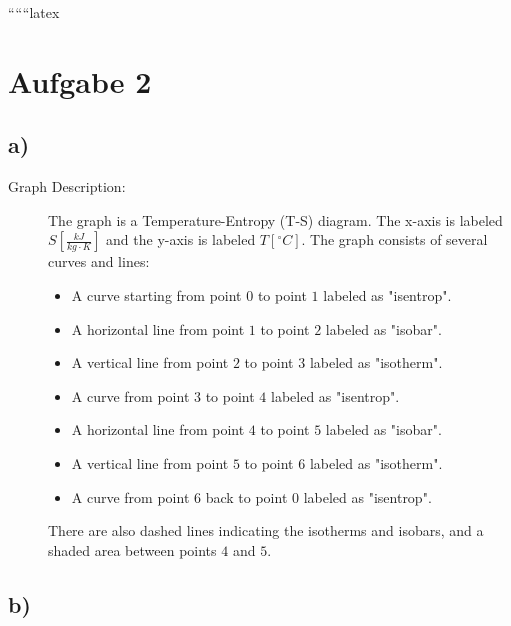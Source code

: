 
``````latex


\section*{Aufgabe 2}

\subsection*{a)}

\begin{description}
    \item[Graph Description:] The graph is a Temperature-Entropy (T-S) diagram. The x-axis is labeled $S \left[ \frac{kJ}{kg \cdot K} \right]$ and the y-axis is labeled $T [^\circ C]$. The graph consists of several curves and lines:
    \begin{itemize}
        \item A curve starting from point $0$ to point $1$ labeled as "isentrop".
        \item A horizontal line from point $1$ to point $2$ labeled as "isobar".
        \item A vertical line from point $2$ to point $3$ labeled as "isotherm".
        \item A curve from point $3$ to point $4$ labeled as "isentrop".
        \item A horizontal line from point $4$ to point $5$ labeled as "isobar".
        \item A vertical line from point $5$ to point $6$ labeled as "isotherm".
        \item A curve from point $6$ back to point $0$ labeled as "isentrop".
    \end{itemize}
    There are also dashed lines indicating the isotherms and isobars, and a shaded area between points $4$ and $5$.
\end{description}

\subsection*{b)}

